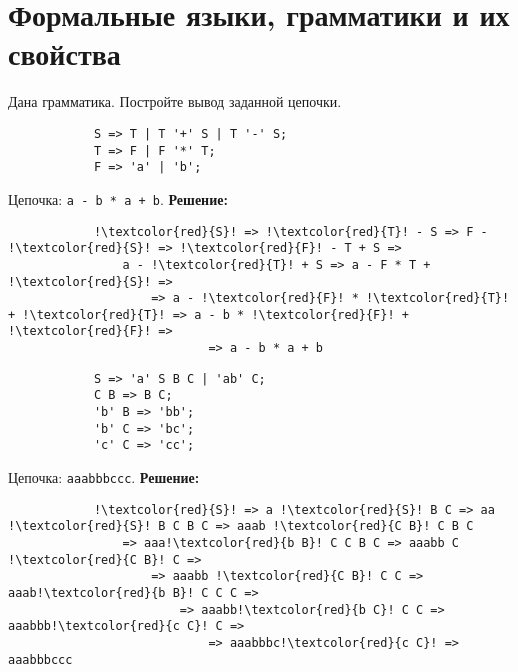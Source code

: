 \documentclass[]{article}
\begin{document}
\section{Формальные языки, грамматики и их свойства}

\begin{enumerate}

\begin{item}
    Дана грамматика. Постройте вывод заданной цепочки.
    \begin{enumerate}
    
    \begin{item}
        \begin{lstlisting}
            S => T | T '+' S | T '-' S;
            T => F | F '*' T;
            F => 'a' | 'b';
        \end{lstlisting}
        Цепочка: \lstinline|a - b * a + b|.
        \bigbreak
        \textbf{Решение:}
        \begin{lstlisting}
            !\textcolor{red}{S}! => !\textcolor{red}{T}! - S => F - !\textcolor{red}{S}! => !\textcolor{red}{F}! - T + S =>
                a - !\textcolor{red}{T}! + S => a - F * T + !\textcolor{red}{S}! => 
                    => a - !\textcolor{red}{F}! * !\textcolor{red}{T}! + !\textcolor{red}{T}! => a - b * !\textcolor{red}{F}! + !\textcolor{red}{F}! =>
                            => a - b * a + b
        \end{lstlisting}
    \end{item}
    
    \begin{item}
        \begin{lstlisting}
            S => 'a' S B C | 'ab' C;
            C B => B C;
            'b' B => 'bb';
            'b' C => 'bc';
            'c' C => 'cc';
        \end{lstlisting}
        Цепочка: \lstinline|aaabbbccc|.
        \bigbreak
        \textbf{Решение:}
        \begin{lstlisting}
            !\textcolor{red}{S}! => a !\textcolor{red}{S}! B C => aa !\textcolor{red}{S}! B C B C => aaab !\textcolor{red}{C B}! C B C
                => aaa!\textcolor{red}{b B}! C C B C => aaabb C !\textcolor{red}{C B}! C =>
                    => aaabb !\textcolor{red}{C B}! C C => aaab!\textcolor{red}{b B}! C C C =>
                        => aaabb!\textcolor{red}{b C}! C C => aaabbb!\textcolor{red}{c C}! C =>
                            => aaabbbc!\textcolor{red}{c C}! => aaabbbccc
        \end{lstlisting}
    \end{item}
    

\end{enumerate}
\end{item}
\end{enumerate}
\end{document}
